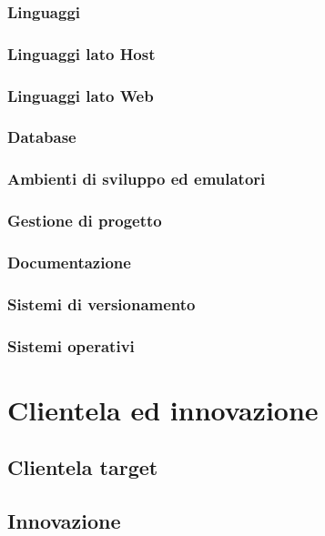 	\subsubsection{Linguaggi}
	
	\subsubsection{Linguaggi lato Host}

	\subsubsection{Linguaggi lato Web}

	\subsubsection{Database}

	\subsubsection{Ambienti di sviluppo ed emulatori}

	\subsubsection{Gestione di progetto}

	\subsubsection{Documentazione}

	\subsubsection{Sistemi di versionamento}

	\subsubsection{Sistemi operativi}

\section{Clientela ed innovazione}

	\subsection{Clientela target}

	
	\subsection{Innovazione}
